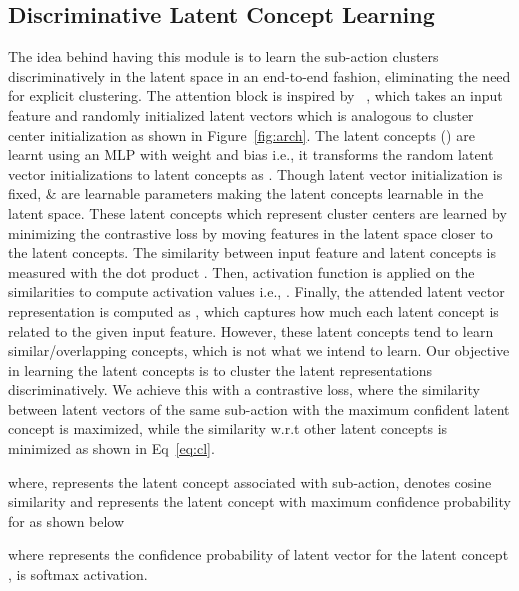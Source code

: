 \documentclass[final]{cvpr}
\begin{document}
\subsection{Discriminative Latent Concept Learning}
\label{sec:dislc}
\par The idea behind having this module is to learn the sub-action clusters discriminatively in the latent space in an end-to-end fashion, eliminating the need for explicit clustering. 
The attention block is inspired by ~\cite{hussein2019videograph}, which  takes an input feature  and randomly initialized latent vectors  which is analogous to cluster center initialization as shown in Figure~\ref{fig:arch}. The latent concepts () are learnt using an MLP with weight  and bias  i.e., it transforms the random latent vector initializations  to latent concepts   as . Though latent vector initialization  is fixed,  \&  are learnable parameters making the latent concepts  learnable in the latent space.  These latent concepts which represent cluster centers are learned by minimizing the contrastive loss by moving features in the latent space closer to the latent concepts. The similarity  between input feature  and latent concepts  is measured with the dot product .  Then, activation function  is applied on the similarities to compute activation values  i.e., . Finally, the attended latent vector representation is computed as , which captures how much each latent concept is related to the given input feature. 
However, these latent concepts tend to learn similar/overlapping concepts, which is not what we intend to learn.
Our objective in learning the latent concepts is to cluster the latent representations discriminatively. We achieve this with a contrastive loss, where the similarity between latent vectors of the same sub-action with the maximum confident latent concept is maximized, while the similarity w.r.t other latent concepts is minimized as shown in Eq~\ref{eq:cl}.
\vspace{-0.4cm}

\vspace{-0.3cm}

\noindent where,  represents the latent concept associated with  sub-action,  denotes cosine similarity and  represents the latent concept with maximum confidence probability for  as shown below
\vspace{-0.2cm}

\noindent where {\small } represents the confidence probability of latent vector  for the latent concept ,  is softmax activation. 
\end{document}
